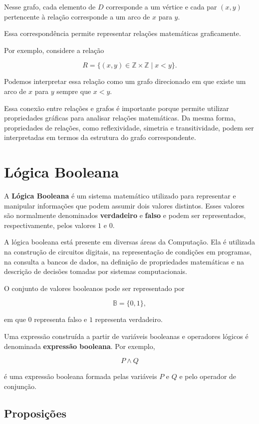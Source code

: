 \documentclass[
  brazilian,
  letterpaper,
]{book}
\theoremstyle{plain}
\theoremstyle{definition}
\theoremstyle{remark}
\begin{document}
Nesse grafo, cada elemento de \(D\) corresponde a um vértice e cada par
\((x,y)\) pertencente à relação corresponde a um arco de \(x\) para
\(y\).

Essa correspondência permite representar relações matemáticas
graficamente.

Por exemplo, considere a relação

\[
R=\{(x,y)\in\mathbb{Z}\times\mathbb{Z}\mid x<y\}.
\]

Podemos interpretar essa relação como um grafo direcionado em que existe
um arco de \(x\) para \(y\) sempre que \(x<y\).

Essa conexão entre relações e grafos é importante porque permite
utilizar propriedades gráficas para analisar relações matemáticas. Da
mesma forma, propriedades de relações, como reflexividade, simetria e
transitividade, podem ser interpretadas em termos da estrutura do grafo
correspondente.

\section{Lógica Booleana}\label{luxf3gica-booleana}

A \textbf{Lógica Booleana} é um sistema matemático utilizado para
representar e manipular informações que podem assumir dois valores
distintos. Esses valores são normalmente denominados \textbf{verdadeiro}
e \textbf{falso} e podem ser representados, respectivamente, pelos
valores \(1\) e \(0\).

A lógica booleana está presente em diversas áreas da Computação. Ela é
utilizada na construção de circuitos digitais, na representação de
condições em programas, na consulta a bancos de dados, na definição de
propriedades matemáticas e na descrição de decisões tomadas por sistemas
computacionais.

O conjunto de valores booleanos pode ser representado por

\[
\mathbb{B}=\{0,1\},
\]

em que \(0\) representa falso e \(1\) representa verdadeiro.

Uma expressão construída a partir de variáveis booleanas e operadores
lógicos é denominada \textbf{expressão booleana}. Por exemplo,

\[
P\wedge Q
\]

é uma expressão booleana formada pelas variáveis \(P\) e \(Q\) e pelo
operador de conjunção.

\subsection{Proposições}\label{proposiuxe7uxf5es}
\end{document}
